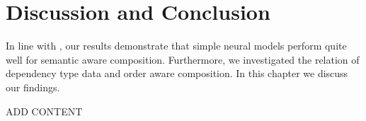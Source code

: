 \section{Discussion and Conclusion}

In line with \autocite{mueller_siamese_2016}, our results demonstrate that simple neural models perform quite well for semantic aware composition. Furthermore, we investigated the relation of dependency type data and order aware composition. In this chapter we discuss our findings.%


ADD CONTENT


